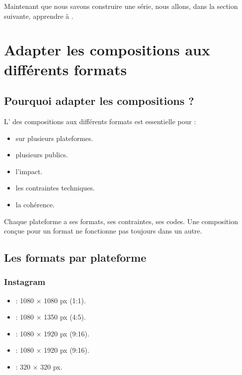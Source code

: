 Maintenant que nous savons construire une série, nous allons, dans la section suivante, apprendre à .

\section{Adapter les compositions aux différents formats}

\subsection{Pourquoi adapter les compositions ?}

L' des compositions aux différents formats est essentielle pour :

\begin{itemize}
    \item {} sur plusieurs plateformes.
    \item {} plusieurs publics.
    \item {} l'impact.
    \item {} les contraintes techniques.
    \item {} la cohérence.
\end{itemize}

Chaque plateforme a ses formats, ses contraintes, ses codes. Une composition conçue pour un format ne fonctionne pas toujours dans un autre.

\subsection{Les formats par plateforme}

\subsubsection{Instagram}

\begin{itemize}
    \item {} : 1080 × 1080 px (1:1).
    \item {} : 1080 × 1350 px (4:5).
    \item {} : 1080 × 1920 px (9:16).
    \item {} : 1080 × 1920 px (9:16).
    \item {} : 320 × 320 px.
\end{itemize}

